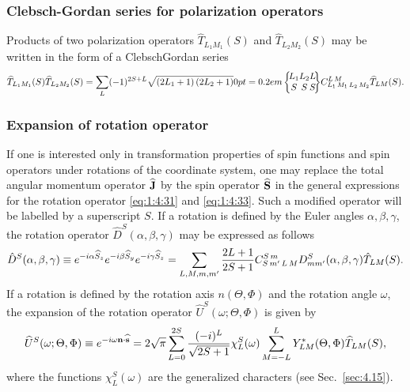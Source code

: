 \subsubsection{Clebsch-Gordan series for polarization operators}

Products of two polarization operators $\widehat{T}_{L_{1} M_{1}}(S)$ and $\widehat{T}_{L_{2} M_{2}}(S)$ may be written in the form of a ClebschGordan series
\begin{equation}
\widehat{T}_{L_{1} M_{1}}(S) \widehat{T}_{L_{2} M_{2}}(S)=\sum_{L}(-1)^{2 S+L} \sqrt{\left(2 L_{1}+1\right)\left(2 L_{2}+1\right)}\sixj{L_{1} }{ L_{2} }{ L }{S }{ S }{ S} \clebsch{L_{1}}{M_{1}}{L_{2}}{M_{2}}{L}{M} \widehat{T}_{L M}(S).
\label{eq:2:4:16}
\end{equation}
\subsubsection{Expansion of rotation operator}
If one is interested only in transformation properties of spin functions and spin operators under rotations of the coordinate system, one may replace the total angular momentum operator $\widehat{\mathbf{J}}$ by the spin operator $\widehat{\mathbf{S}}$ in the general expressions for the rotation operator \eqref{eq:1:4:31} and \eqref{eq:1:4:33}. Such a modified operator will be labelled by a superscript $S$. If a rotation is defined by the Euler angles $\alpha, \beta, \gamma$, the rotation operator $\hat{D}^{S}(\alpha, \beta, \gamma)$ may be expressed as follows
\begin{equation}
\hat{D}^{S}(\alpha, \beta, \gamma) \equiv e^{-i \alpha \widehat{S}_{z}} e^{-i \beta \widehat{S}_{y}} e^{-i \gamma \widehat{S}_{z}}=\sum_{L, M, m, m^{\prime}} \frac{2 L+1}{2 S+1} C_{S\,m^{\prime}\,L\,M}^{S\,m} D_{m m^{\prime}}^{S}(\alpha, \beta, \gamma) \hat{T}_{L M}(S) .\label{eq:2:4:17}
\end{equation}
If a rotation is defined by the rotation axis $n(\Theta, \Phi)$ and the rotation angle $\omega$, the expansion of the rotation operator $\hat{U}^{S}(\omega ; \Theta, \Phi)$ is given by
\begin{equation}
\widehat{U}^{S}(\omega ; \Theta, \Phi) \equiv e^{-i \omega \mathbf{n} \cdot \widehat{\mathbf{s}}}=2 \sqrt{\pi} \sum_{L=0}^{2 S} \frac{(-i)^{L}}{\sqrt{2 S+1}} \chi_{L}^{S}(\omega) \sum_{M=-L}^{L} Y_{L M}^{*}(\Theta, \Phi) \widehat{T}_{L M}(S) ,\label{eq:2:4:18}
\end{equation}
where the functions $\chi_{L}^{S}(\omega)$ are the generalized characters (see Sec.~\ref{sec:4.15}).

